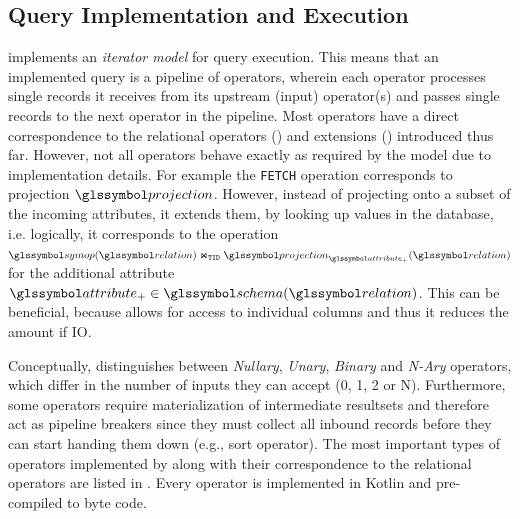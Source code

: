 \subsection{Query Implementation and Execution}

\cottontail{} implements an \emph{iterator model} for query execution. This means that an implemented query is a pipeline of operators, wherein each operator processes single records it receives from its upstream (input) operator(s) and passes single records to the next operator in the pipeline. Most operators have a direct correspondence to the relational operators () and extensions () introduced thus far. However, not all operators behave exactly as required by the model due to implementation details. For example the \texttt{FETCH} operation corresponds to projection $\projection$. However, instead of projecting onto a subset of the incoming attributes, it extends them, by looking up values in the database, i.e. logically, it corresponds to the operation $\symop(\relation) \Join_{\mathtt{TID}} \projection_{\attribute_{+}}(\relation)$ for the additional attribute $\attribute_{+} \in \schema(\relation)$. This can be beneficial, because \cottontail{} allows for access to individual columns and thus it reduces the amount if IO.

Conceptually, \cottontail{} distinguishes between \emph{Nullary}, \emph{Unary}, \emph{Binary} and \emph{N-Ary} operators, which differ in the number of inputs they can accept (0, 1, 2 or N). Furthermore, some operators require materialization of intermediate resultsets and therefore act as pipeline breakers since they must collect all inbound records before they can start handing them down (e.g., sort operator). The most important types of operators implemented by \cottontail{} along with their correspondence to the relational operators are listed in . Every operator is implemented in Kotlin and pre-compiled to byte code.

